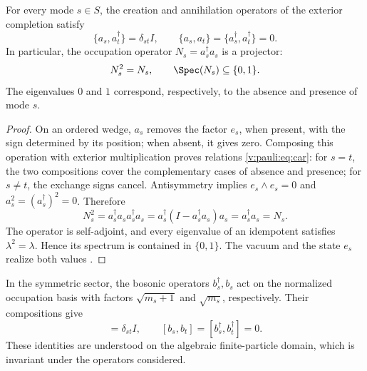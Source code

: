 \begin{theorem}
\label{v:rec:completaciones:statement:01}
\label{v:rec:thm:principio-exclusion-pauli}
For every mode \(s\in S\), the creation and annihilation operators of the
exterior completion satisfy
\begin{equation}
 \{a_s,a_t^\dagger\}=\delta_{st}I,
 \qquad
 \{a_s,a_t\}=\{a_s^\dagger,a_t^\dagger\}=0.
 \label{v:pauli:eq:car}
\end{equation}
In particular, the occupation operator
\(N_s=a_s^\dagger a_s\) is a projector:
\begin{equation}
 N_s^2=N_s,
 \qquad \Spec(N_s)\subseteq\{0,1\}.
 \label{v:pauli:eq:proyeccion-ocupacion}
\end{equation}
The eigenvalues \(0\) and \(1\) correspond, respectively, to the absence
and presence of mode \(s\).
\end{theorem}

\begin{proof}
On an ordered wedge, \(a_s\) removes the factor \(e_s\), when present,
with the sign determined by its position; when absent, it gives zero. Composing
this operation with exterior multiplication proves relations
\eqref{v:pauli:eq:car}: for \(s=t\), the two compositions cover the
complementary cases of absence and presence; for \(s\ne t\), the exchange
signs cancel. Antisymmetry implies
\(e_s\wedge e_s=0\) and
\(a_s^2=(a_s^\dagger)^2=0\). Therefore
\begin{equation}
 N_s^2=a_s^\dagger a_s a_s^\dagger a_s
 =a_s^\dagger(I-a_s^\dagger a_s)a_s
 =a_s^\dagger a_s=N_s.
 \label{v:pauli:eq:prueba-idempotencia}
\end{equation}
The operator is self-adjoint, and every eigenvalue of an idempotent satisfies
\(\lambda^2=\lambda\). Hence its spectrum is contained in
\(\{0,1\}\). The vacuum and the state \(e_s\) realize both values
\cite{Pauli1925,Dirac1926}.
\end{proof}

In the symmetric sector, the bosonic operators \(b_s^\dagger,b_s\)
act on the normalized occupation basis with factors
\(\sqrt{m_s+1}\) and \(\sqrt{m_s}\), respectively. Their compositions
give
\begin{equation}
 [b_s,b_t^\dagger]=\delta_{st}I,
 \qquad [b_s,b_t]=[b_s^\dagger,b_t^\dagger]=0.
 \label{v:pauli:eq:ccr}
\end{equation}
These identities are understood on the algebraic finite-particle domain,
which is invariant under the operators considered.

